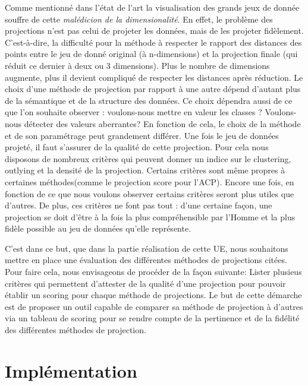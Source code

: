 Comme mentionné dans l’état de l’art la visualisation des grands jeux de donnée souffre de cette \textit{malédicion de la dimensionalité}. En effet, le problème des projections n’est pas celui de projeter les données, mais de les projeter fidèlement. 
C’est-à-dire, la difficulté pour la méthode à respecter le rapport des distances des points entre le jeu de donné original (à n-dimensions) et la projection finale (qui réduit ce dernier à deux ou 3 dimensions). 
Plus le nombre de dimensions augmente, plus il devient compliqué de respecter les distances après réduction. 
\newline
Le choix d’une méthode de projection par rapport à une autre dépend d'autant plus de la sémantique et de la structure des données. Ce choix dépendra aussi de ce que l’on souhaite observer : voulons-nous mettre en valeur les classes ? Voulons-nous détecter des valeurs aberrantes? 
En fonction de cela, le choix de la méthode et de son paramétrage peut grandement différer.
\smallskip
Une fois le jeu de données projeté, il faut s’assurer de la qualité de cette projection.
Pour cela nous disposons de nombreux critères qui peuvent donner un indice sur le clustering, outlying et la densité de la projection. Certains critères sont même propres à certaines méthodes(comme le projection score pour l'ACP).
Encore une fois, en fonction de ce que nous voulons observer certains critères seront plus utiles que d'autres. De plus, ces critères ne font pas tout : d’une certaine façon, une projection se doit d’être à la fois la plus compréhensible par l’Homme et la plus fidèle possible au jeu de données qu’elle représente.


\medskip
C'est dans ce but, que dans la partie réalisation de cette UE, nous souhaitons mettre en place une évaluation des différentes méthodes de projections citées.
Pour faire cela, nous envisageons de procéder de la façon suivante: \newline
Lister plusieus critères qui permettent d'attester de la qualité d'une projection pour pouvoir établir un scoring pour chaque méthode de projections.
Le but de cette démarche est de proposer un outil capable de comparer sa méthode de projection à d'autres via un tableau de scoring pour se rendre compte de la pertinence et de la fidélité des différentes méthodes de projection.

\medskip


\section{Implémentation}


